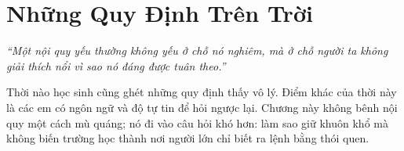 \chapter{Những Quy Định Trên Trời}

\begin{center}
	\textit{\color{bookprimary}``Một nội quy yếu thường không yếu ở chỗ nó nghiêm, mà ở chỗ người ta không giải thích nổi vì sao nó đáng được tuân theo.''}
\end{center}

\ngancach

\begin{tcolorbox}[
	colback=booksecondary!8,
	colframe=booksecondary!40,
	arc=5pt,
	title={\bfseries Ý Chính Của Chương},
	fonttitle=\bfseries\color{booksecondary}
]
Thời nào học sinh cũng ghét những quy định thấy vô lý. Điểm khác của thời này là các em có ngôn ngữ và độ tự tin để hỏi ngược lại. Chương này không bênh nội quy một cách mù quáng; nó đi vào câu hỏi khó hơn: làm sao giữ khuôn khổ mà không biến trường học thành nơi người lớn chỉ biết ra lệnh bằng thói quen.
\end{tcolorbox}

